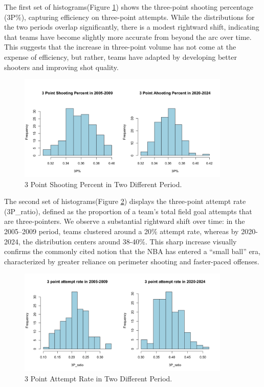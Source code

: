 \documentclass[11pt, a4paper]{article} %
\begin{document}
The first set of histograms(Figure \ref{fig:3P_shooting_percent}) shows the three-point shooting percentage (3P\%), capturing efficiency on three-point attempts. While the 
distributions for the two periods overlap significantly, there is a modest rightward shift, indicating that teams have become slightly 
more accurate from beyond the arc over time. This suggests that the increase in three-point volume has not come at the expense of efficiency, 
but rather, teams have adapted by developing better shooters and improving shot quality.

\begin{figure}[htbp]
    \centering
    \includegraphics[width=0.9\textwidth]{figure/3P shooting percent.jpg}
    \caption{3 Point Shooting Percent in Two Different Period.}
    \label{fig:3P_shooting_percent}
\end{figure}

The second set of histograms(Figure \ref{fig:3P_attempt_rate}) displays the three-point attempt rate (3P\_ratio), defined as the proportion of a team's total field goal 
attempts that are three-pointers. We observe a substantial rightward shift over time: in the 2005–2009 period, teams clustered around a 
20\% attempt rate, whereas by 2020-2024, the distribution centers around 38-40\%. This sharp increase visually confirms the commonly 
cited notion that the NBA has entered a “small ball” era, characterized by greater reliance on perimeter shooting and faster-paced offenses.

\begin{figure}[htbp]
    \centering
    \includegraphics[width=0.9\textwidth]{figure/3 point attempt rate.jpg}
    \caption{3 Point Attempt Rate in Two Different Period.}
    \label{fig:3P_attempt_rate}
\end{figure}
\end{document}
